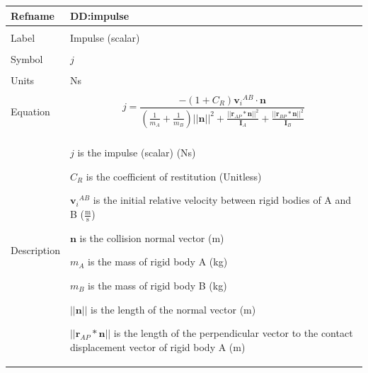 \documentclass[12pt]{article}
\begin{document}
\noindent \begin{minipage}{\textwidth}
\begin{tabular}{p{} p{}}
\toprule \textbf{Refname} & \textbf{DD:impulse}
\label{DD:impulse}
\\ \midrule \\
Label & Impulse (scalar)
        \\ \midrule \\
        Symbol & $j$
                 \\ \midrule \\
                 Units & Ns
                         \\ \midrule \\
                         Equation & \begin{displaymath}
                                    j=\frac{-\left(1+{C_{R}}\right) {{\mathbf{v}_{i}}^{AB}}\cdot{}\mathbf{n}}{\left(\frac{1}{{m_{A}}}+\frac{1}{{m_{B}}}\right) ||\mathbf{n}||^{2}+\frac{||{\mathbf{r}_{AP}}*\mathbf{n}||^{2}}{{\mathbf{I}_{A}}}+\frac{||{\mathbf{r}_{BP}}*\mathbf{n}||^{2}}{{\mathbf{I}_{B}}}}
                                    \end{displaymath}
                                    \\ \midrule \\
                                    Description & \begin{symbDescription}
                                                  \item{$j$ is the impulse (scalar) (Ns)}
                                                  \item{${C_{R}}$ is the coefficient of restitution (Unitless)}
                                                  \item{${{\mathbf{v}_{i}}^{AB}}$ is the initial relative velocity between rigid bodies of A and B ($\frac{\text{m}}{\text{s}}$)}
                                                  \item{$\mathbf{n}$ is the collision normal vector (m)}
                                                  \item{${m_{A}}$ is the mass of rigid body A (kg)}
                                                  \item{${m_{B}}$ is the mass of rigid body B (kg)}
                                                  \item{$||\mathbf{n}||$ is the length of the normal vector (m)}
                                                  \item{$||{\mathbf{r}_{AP}}*\mathbf{n}||$ is the length of the perpendicular vector to the contact displacement vector of rigid body A (m)}

\end{symbDescription}
\end{tabular}
\end{minipage}
\end{document}

